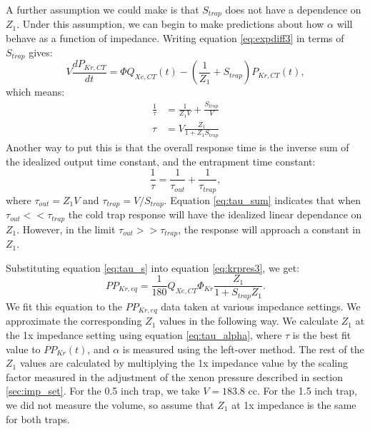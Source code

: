 A further assumption we could make is that $S_{trap}$ does not have a dependence on $Z_1$. Under this assumption, we can begin to make predictions about how $\alpha$ will behave as a function of impedance. Writing equation \ref{eq:expdiff3} in terms of $S_{trap}$ gives:
\begin{equation}
V\frac{dP_{Kr,CT}}{dt}=\Phi Q_{Xe,CT}(t)-(\frac{1}{Z_1}+S_{trap})P_{Kr,CT}(t),
\end{equation}
which means:
\begin{align}
\label{eq:tau_s}
\frac{1}{\tau}&=\frac{1}{Z_1 V}+\frac{S_{trap}}{V}\\
\tau&=V\frac{Z_1}{1+Z_1S_{trap}}
\end{align}
Another way to put this is that the overall response time is the inverse sum of the idealized output time constant, and the entrapment time constant:
\begin{equation}
\label{eq:tau_sum}
\frac{1}{\tau}=\frac{1}{\tau_{out}}+\frac{1}{\tau_{trap}},
\end{equation}
where $\tau_{out}=Z_1V$ and $\tau_{trap}=V/S_{trap}$. Equation \ref{eq:tau_sum} indicates that when $\tau_{out}<<\tau_{trap}$ the cold trap response will have the idealized linear dependance on $Z_1$. However, in the limit $\tau_{out}>>\tau_{trap}$, the response will approach a constant in $Z_1$.

Substituting equation \ref{eq:tau_s} into equation \ref{eq:krpres3}, we get:
\begin{equation}
\label{eq:krpres4}
PP_{Kr,eq}=\frac{1}{180}Q_{Xe,CT}\Phi_{Kr}\frac{Z_1}{1+S_{trap}Z_1}.
\end{equation}
We fit this equation to the $PP_{Kr,eq}$ data taken at various impedance settings. We approximate the corresponding $Z_1$ values in the following way. We calculate $Z_1$ at the 1x impedance setting using equation \ref{eq:tau_alpha}, where $\tau$ is the best fit value to $PP_{Kr}(t)$, and $\alpha$ is measured using the left-over method. The rest of the $Z_1$ values are calculated by multiplying the 1x impedance value by the scaling factor measured in the adjustment of the xenon pressure described in section \ref{sec:imp_set}. For the 0.5 inch trap, we take $V=183.8$ cc. For the 1.5 inch trap, we did not measure the volume, so assume that $Z_1$ at 1x impedance is the same for both traps.

